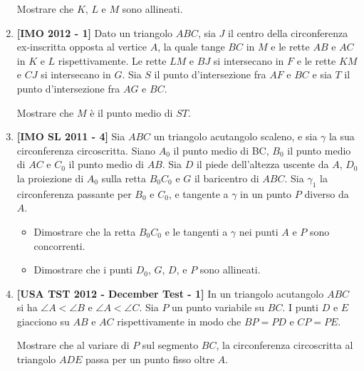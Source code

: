 \begin{enumerate}
	Mostrare che $K$, $L$ e $M$ sono allineati.
	
	\item \textbf{[IMO 2012 - 1]} Dato un triangolo $ABC$, sia $J$ il centro della circonferenza ex-inscritta opposta al vertice $A$, la quale tange $BC$ in $M$ e le rette $AB$ e $AC$ in $K$ e $L$ rispettivamente. Le rette $LM$ e $BJ$ si intersecano in $F$ e le rette $KM$ e $CJ$ si intersecano in $G$. Sia $S$ il punto d'intersezione fra $AF$ e $BC$ e sia $T$ il punto d'intersezione fra $AG$ e $BC$. 
	
	Mostrare che $M$ è il punto medio di $ST$.
	\item \textbf{[IMO SL 2011 - 4]} Sia $ABC$ un triangolo acutangolo scaleno, e sia $\gamma$ la sua circonferenza circoscritta.
	Siano $A_0$ il punto medio di BC, $B_0$ il punto medio di $AC$ e $C_0$ il punto medio di $AB$. Sia
	$D$ il piede dell’altezza uscente da $A$, $D_0$ la proiezione di $A_0$ sulla retta $B_0C_0$ e $G$ il
	baricentro di $ABC$. Sia $\gamma_1$ la circonferenza passante per $B_0$ e $C_0$, e tangente a $\gamma$ in un
	punto $P$ diverso da $A$.
	\begin{itemize}
	\item Dimostrare che la retta $B_0C_0$ e le tangenti a $\gamma$ nei punti $A$ e $P$ sono concorrenti.
	\item Dimostrare che i punti $D_0$, $G$, $D$, e $P$ sono allineati.
	\end{itemize}
	\item \textbf{[USA TST 2012 - December Test - 1]} In un triangolo acutangolo $ABC$ si ha $\angle A<\angle B$ e $\angle A<\angle C$. Sia $P$ un punto variabile su $BC$. I punti $D$ e $E$ giacciono su $AB$ e $AC$ rispettivamente in modo che $BP=PD$ e $CP=PE$.
	
	Mostrare che al variare di $P$ sul segmento $BC$, la circonferenza circoscritta al triangolo $ADE$ passa per un punto fisso oltre $A$.
\end{enumerate}
\clearpage
